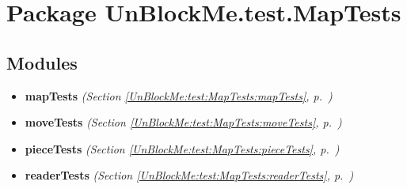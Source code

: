 %
%
%


\section{Package UnBlockMe.test.MapTests}

    \label{UnBlockMe:test:MapTests}


\subsection{Modules}

\begin{itemize}
\setlength{\parskip}{0ex}
\item \textbf{mapTests}
  \textit{(Section \ref{UnBlockMe:test:MapTests:mapTests}, p.~\pageref{UnBlockMe:test:MapTests:mapTests})}

\item \textbf{moveTests}
  \textit{(Section \ref{UnBlockMe:test:MapTests:moveTests}, p.~\pageref{UnBlockMe:test:MapTests:moveTests})}

\item \textbf{pieceTests}
  \textit{(Section \ref{UnBlockMe:test:MapTests:pieceTests}, p.~\pageref{UnBlockMe:test:MapTests:pieceTests})}

\item \textbf{readerTests}
  \textit{(Section \ref{UnBlockMe:test:MapTests:readerTests}, p.~\pageref{UnBlockMe:test:MapTests:readerTests})}

\end{itemize}



